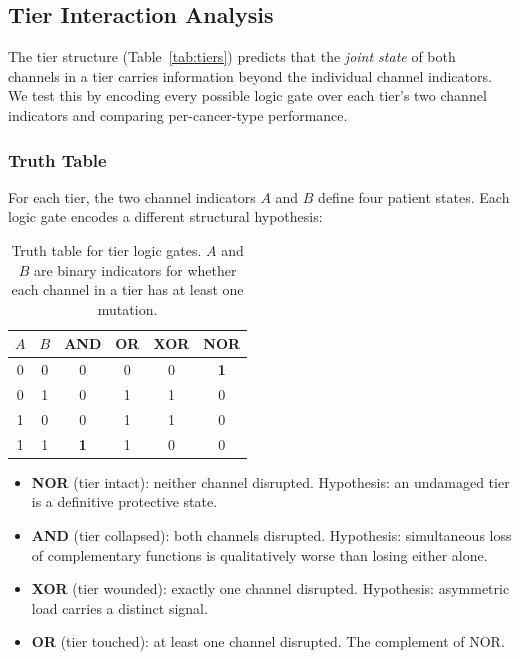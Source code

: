 \documentclass[11pt]{article}
\begin{document}
\subsection{Tier Interaction Analysis}
\label{sec:tiers}

The tier structure (Table~\ref{tab:tiers}) predicts that the
\emph{joint state} of both channels in a tier carries information
beyond the individual channel indicators. We test this by
encoding every possible logic gate over each tier's two channel
indicators and comparing per-cancer-type performance.

\subsubsection{Truth Table}

For each tier, the two channel indicators $A$ and $B$ define
four patient states. Each logic gate encodes a different
structural hypothesis:

\begin{table}[ht]
\centering
\caption{Truth table for tier logic gates. $A$ and $B$ are
binary indicators for whether each channel in a tier has at
least one mutation.}
\label{tab:truth}
\begin{tabular}{@{}cc|cccc@{}}
\toprule
$A$ & $B$ & AND & OR & XOR & NOR \\
\midrule
0 & 0 & 0 & 0 & 0 & \textbf{1} \\
0 & 1 & 0 & 1 & 1 & 0 \\
1 & 0 & 0 & 1 & 1 & 0 \\
1 & 1 & \textbf{1} & 1 & 0 & 0 \\
\bottomrule
\end{tabular}
\end{table}

\begin{itemize}
\item \textbf{NOR} (tier intact): neither channel disrupted.
   Hypothesis: an undamaged tier is a definitive protective state.
\item \textbf{AND} (tier collapsed): both channels disrupted.
   Hypothesis: simultaneous loss of complementary functions is
   qualitatively worse than losing either alone.
\item \textbf{XOR} (tier wounded): exactly one channel disrupted.
   Hypothesis: asymmetric load carries a distinct signal.
\item \textbf{OR} (tier touched): at least one channel disrupted.
   The complement of NOR.
\end{itemize}
\end{document}
